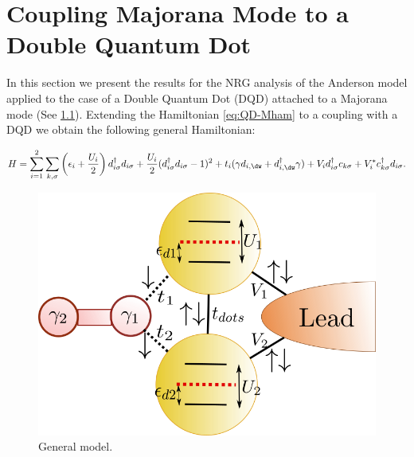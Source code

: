 \chapter{Coupling Majorana Mode to a Double Quantum Dot \label{chap:Results}}
In this section we present the results for the NRG analysis of the Anderson model applied to the case of a Double Quantum Dot (DQD) attached to a Majorana mode (See \ref{fig:GeneralModel}). Extending the  Hamiltonian \eqref{eq:QD-Mham} to a coupling with a DQD we obtain the following general Hamiltonian:   

\begin{equation}
H =\sum_{i=1}^2\sum_{k,\sigma}\left(\epsilon_{i}+\frac{U_i}{2}\right)d_{i\sigma}^{\dagger}d_{i\sigma}+ \frac{U_i}{2}(d_{i \sigma}^{\dagger}d_{i \sigma}-1)^{2} + t_i(\gamma d_{i,\dw}+d^\dagger_{i,\dw}\gamma) + V_id^\dagger_{i\sigma}c_{k\sigma}+V_i^* c^\dagger_{k\sigma}d_{i\sigma}.
\label{General model}
\end{equation}



\begin{figure}[h]
\centering
\includegraphics[scale=0.4]{IMAGES/GenModel.png}
\caption{\label{fig:GeneralModel}General model. \protect{}} 
\end{figure}




